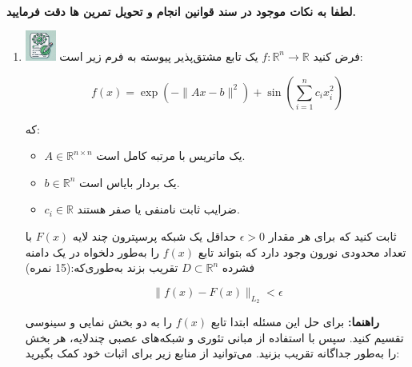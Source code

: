 \documentclass[12pt]{article}
\begin{document}
\fontsize{12pt}{14pt}\selectfont



\\
{\fontsize{14}{22}\selectfont \textbf{لطفا به نکات موجود در سند قوانین انجام و تحویل تمرین ها دقت فرمایید. }}

\begin{enumerate}

    \section*{سوالات تئوری}
    \item \includegraphics[width=1cm]{figs/Allowed_with_contributino.jpg}
     فرض کنید $f: \mathbb{R}^n \to \mathbb{R}$ یک تابع مشتق‌پذیر پیوسته به فرم زیر است:

    \[
    f(x) = \exp(-\|Ax - b\|^2) + \sin\left(\sum_{i=1}^{n} c_i x_i^2\right)
    \]
    
    که:
    \begin{itemize}
        \item $A \in \mathbb{R}^{n \times n}$ یک ماتریس با مرتبه کامل است.
        \item $b \in \mathbb{R}^n$ یک بردار بایاس است.
        \item $c_i \in \mathbb{R}$ ضرایب ثابت نامنفی یا صفر هستند.
    \end{itemize}
    
    ثابت کنید که برای هر مقدار $\epsilon > 0$ حداقل یک شبکه پرسپترون چند لایه $F(x)$ با تعداد محدودی نورون وجود دارد که بتواند تابع $f(x)$ را به‌طور دلخواه در یک دامنه فشرده $D \subset \mathbb{R}^n$ تقریب بزند به‌طوری‌که:(15 نمره)
    
    \[
    \| f(x) - F(x) \|_{L_2} < \epsilon
    \]
    
    \textbf{راهنما:} برای حل این مسئله ابتدا تابع $f(x)$ را به دو بخش نمایی و سینوسی تقسیم کنید. سپس با استفاده از مبانی تئوری و شبکه‌های عصبی چندلایه، هر بخش را به‌طور جداگانه تقریب بزنید. می‌توانید از منابع زیر برای اثبات خود کمک بگیرید:



\end{enumerate}
\end{document}
